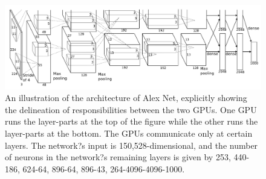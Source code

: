 \documentclass[a4paper,12pt]{article}
\begin{document}
 \begin{figure}[H]
  \begin{center}
      \includegraphics[scale=0.55]{alexnet.png}
\end{center}
\caption{An illustration of the architecture of Alex Net, explicitly showing the delineation of responsibilities between the two GPUs. One GPU runs the layer-parts at the top of the figure while the other runs the layer-parts at the bottom. The GPUs communicate only at certain layers. The network?s input is 150,528-dimensional, and the number of neurons in the network?s remaining layers is given by 253, 440-186, 624-64, 896-64, 896-43, 264-4096-4096-1000\cite{NIPS2012_4824}.}
 \label{fig:alexnet}
 \end{figure}
\end{document}
